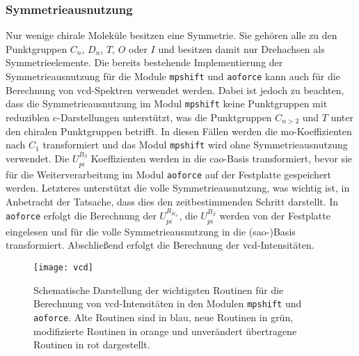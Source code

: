 	\subsubsection{Symmetrieausnutzung}
	Nur wenige chirale Moleküle besitzen eine Symmetrie. Sie gehören alle zu den Punktgruppen $C_n$, $D_n$, $T$, $O$ oder $I$ und besitzen damit nur Drehachsen als Symmetrieelemente. Die bereits bestehende Implementierung der Symmetrieausnutzung\supercite{haser1991molecular} für die Module \texttt{mpshift} und \texttt{aoforce} kann auch für die Berechnung von \ac{vcd}-Spektren verwendet werden. Dabei ist jedoch zu beachten, dass die Symmetrieausnutzung im Modul \texttt{mpshift} keine Punktgruppen mit reduziblen $e$-Darstellungen unterstützt, was die Punktgruppen $C_{n>2}$ und $T$ unter den chiralen Punktgruppen betrifft. In diesen Fällen werden die \ac{mo}-Koeffizienten nach $C_1$ transformiert und das Modul \texttt{mpshift} wird ohne Symmetrieausnutzung verwendet. Die $U_{pi}^{B_\beta}$ Koeffizienten werden in die \ac{cao}-Basis transformiert, bevor sie für die Weiterverarbeitung im Modul \texttt{aoforce} auf der Festplatte gespeichert werden. Letzteres unterstützt die volle Symmetrieausnutzung, was wichtig ist, in Anbetracht der Tatsache, dass dies den zeitbestimmenden Schritt darstellt. In \texttt{aoforce} erfolgt die Berechnung der $U_{pi}^{R_{K_\alpha}}$, die $U_{pi}^{B_\beta}$ werden von der Festplatte eingelesen und für die volle Symmetrieausnutzung in die \mbox{(\acs{sao}-)}Basis transformiert. Abschließend erfolgt die Berechnung der \ac{vcd}-Intensitäten.
	 
\vfill
\newpage	
\begin{figure}[ht!]
	\centering
	\texttt{[image: vcd]}
	\captionsetup{figurewithin = chapter}
	\captionsetup{font=small, labelfont=bf}\caption[Wichtigste Routinen für die Berechnung von VCD-Intensitäten]{Schematische Darstellung der wichtigsten Routinen für die Berechnung von \ac{vcd}-Intensitäten in den Modulen \texttt{mpshift} und \texttt{aoforce}. Alte Routinen sind in blau, neue Routinen in grün, modifizierte Routinen in orange und unverändert übertragene Routinen in rot dargestellt.}
\label{abb:programmstrukur_vcd}
\end{figure}
	
\FloatBarrier
\vfill
\newpage
